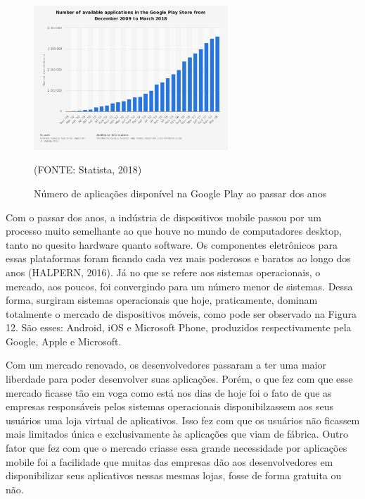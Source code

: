 \documentclass[
    12pt,       %
    openright,      %
    twoside,      %
    a4paper,      %
    english,      %
    french,       %
    spanish,      %
    brazil,       %
    ]{abntex2}
\begin{document}
      \begin{figure}[htbp]
            \begin{center}
                \includegraphics[width=0.65\textwidth]{img/numberApps.png}
            \end{center}
        \caption{\label{fig:passaro}Número de aplicações disponível na Google Play ao passar dos anos}
        \begin{center}(FONTE: Statista, 2018)\end{center}
      \end{figure}

      Com o passar dos anos, a indústria de dispositivos mobile passou por um processo muito
      semelhante ao que houve no mundo de computadores desktop, tanto no quesito hardware quanto
      software. Os componentes eletrônicos para essas plataformas foram ficando cada vez mais
      poderosos e baratos ao longo dos anos (HALPERN, 2016). Já no que se refere aos sistemas
      operacionais, o mercado, aos poucos, foi convergindo para um número menor de sistemas. Dessa
      forma, surgiram sistemas operacionais que hoje, praticamente, dominam totalmente o mercado de
      dispositivos móveis, como pode ser observado na Figura 12. São esses: Android, iOS e
      Microsoft Phone, produzidos respectivamente pela Google, Apple e Microsoft.

      Com um mercado renovado, os desenvolvedores passaram a ter uma maior liberdade para poder
      desenvolver suas aplicações. Porém, o que fez com que esse mercado ficasse tão em voga
      como está nos dias de hoje foi o fato de que as empresas responsáveis pelos sistemas
      operacionais disponibilzassem aos seus usuários uma loja virtual de aplicativos.
      Isso fez com que os usuários não ficassem mais limitados única e exclusivamente
      às aplicações que viam de fábrica. Outro fator que fez com que o mercado criasse
      essa grande necessidade por aplicações mobile foi a facilidade que muitas das
      empresas dão aos desenvolvedores em disponibilizar seus aplicativos nessas mesmas
      lojas, fosse de forma gratuita ou não.
\end{document}
